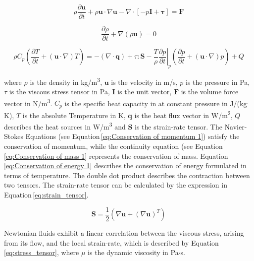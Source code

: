 \begin{equation}
\rho\frac{\partial \boldsymbol u}{\partial t} + \rho\boldsymbol u\cdotp\nabla\boldsymbol u - \nabla\cdotp[-p\boldsymbol I + \boldsymbol \tau] = \boldsymbol F
\label{eq:Conservation of momentum 1}
\end{equation}


\begin{equation}
\frac{\partial\rho}{\partial t}+\nabla(\rho\boldsymbol u) = 0
\label{eq:Conservation of mass 1}
\end{equation}

\begin{equation}
\rho C_{p}\left(\frac{\partial T}{\partial t}+(\boldsymbol u \cdotp\nabla)T\right) = -(\nabla\cdotp\boldsymbol q)+\tau:\boldsymbol S -\frac{T}{\rho}\left.\frac{\partial p}{\partial t}\right\vert_{p}\left(\frac{\partial p}{\partial t}+(\boldsymbol u\cdotp\nabla)p\right)+Q 
\label{eq:Conservation of energy 1}
\end{equation}

where $\rho$ is the density in kg/m\textsuperscript{3}, $\boldsymbol u$ is the velocity in m/s, $p$ is the pressure in Pa, $\tau$ is the viscous stress tensor in Pa, $\boldsymbol I$ is the unit vector, $\boldsymbol F$ is the volume force vector in N/m\textsuperscript{3}. $C_{p}$ is the specific heat capacity in at constant pressure in J/(kg$\cdotp$K), $T$ is the absolute Temperature in K, $\boldsymbol q$ is the heat flux vector in W/m\textsuperscript{2}, $Q$ describes the heat sources in W/m\textsuperscript{3} and $\boldsymbol S$ is the strain-rate tensor. The Navier-Stokes Equations (see Equation\,\ref{eq:Conservation of momentum 1}) satisfy the conservation of momentum, while the continuity equation (see Equation\,\ref{eq:Conservation of mass 1} represents the conservation of mass. Equation\,\ref{eq:Conservation of energy 1} describes the conservation of energy formulated in terms of temperature. The double dot product describes the contraction between two tensors. The strain-rate tensor can be calculated by the expression in Equation\,\ref{eq:strain_tensor}.

\begin{equation}
\boldsymbol S = \frac{1}{2}(\nabla\boldsymbol u+(\nabla\boldsymbol u)^{T})
\label{eq:strain_tensor}
\end{equation}

Newtonian fluids exhibit a linear correlation between the viscous stress, arising from its flow, and the local strain-rate, which is described by Equation\,\ref{eq:stress_tensor}, where $\mu$ is the dynamic viscosity in Pa$\cdotp$s.

